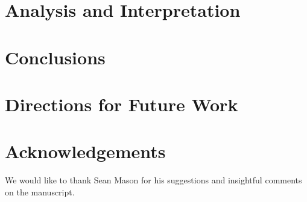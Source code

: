 \documentclass[11pt,a4paper,titlepage]{article}
\begin{document}
\section{Analysis and Interpretation}


\section{Conclusions}


\section{Directions for Future Work}


\section{Acknowledgements}

We would like to thank Sean Mason for his suggestions and insightful comments on the manuscript.



\end{document}
